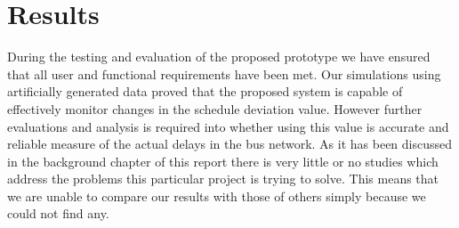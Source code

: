 \section{Results}
During the testing and evaluation of the proposed prototype we have ensured that all user and functional requirements have been met. Our simulations using artificially generated data proved that the proposed system is capable of effectively monitor changes in the schedule deviation value. However further evaluations and analysis is required into whether using this value is accurate and reliable measure of the actual delays in the bus network. As it has been discussed in the background chapter of this report there is very little or no studies which address the problems this particular project is trying to solve. This means that we are unable to compare our results with those of others simply because we could not find any. 



